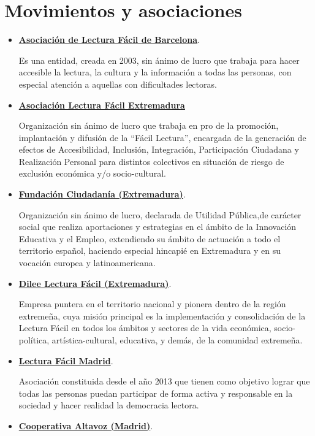 \section{Movimientos y asociaciones}
\begin{itemize}
	\item \href{https://www.lecturafacil.net/es/}{\textbf{Asociación de Lectura Fácil de Barcelona}}.
	
	 Es una entidad, creada en 2003, sin ánimo de lucro que trabaja para hacer accesible la lectura, la cultura y la información a todas las personas, con especial atención a aquellas con dificultades lectoras. 
	\item \href{https://www.lecturafacilextremadura.es/}{\textbf{Asociación Lectura Fácil Extremadura}}
	
	Organización sin ánimo de lucro que trabaja en pro de la promoción, implantación y difusión de la “Fácil Lectura”, encargada de  la generación de efectos de Accesibilidad, Inclusión, Integración, Participación Ciudadana y Realización Personal para distintos colectivos en situación de riesgo de exclusión económica y/o socio-cultural.
	\item \href{https://www.fundacionciudadania.es}{\textbf{Fundación Ciudadanía (Extremadura)}}.
	
	Organización sin ánimo de lucro, declarada de Utilidad Pública,de carácter social que realiza aportaciones y estrategias en el ámbito de la Innovación Educativa y el Empleo, extendiendo su ámbito de actuación a todo el territorio español, haciendo especial hincapié en Extremadura y en su vocación europea y latinoamericana.
	\item \href{https://odsextremadura.es/dilee-lectura-facil-extremadura/}{\textbf{Dilee Lectura Fácil (Extremadura)}}.
	
Empresa puntera en el territorio nacional y pionera dentro de la región extremeña, cuya misión principal es la implementación y consolidación de la Lectura Fácil en todos los ámbitos y sectores de la vida económica, socio-política, artística-cultural, educativa, y demás, de la comunidad extremeña.
	\item \href{https://www.lecturafacilmadrid.com/}{\textbf{Lectura Fácil Madrid}}.
	
	 Asociación constituida desde el año 2013 que tienen como objetivo  lograr que todas las personas puedan participar de forma activa y responsable en la sociedad y hacer realidad la democracia lectora. 
	\item \href{http://altavozcooperativa.org/}{\textbf{Cooperativa Altavoz (Madrid)}}.
	

\end{itemize}
